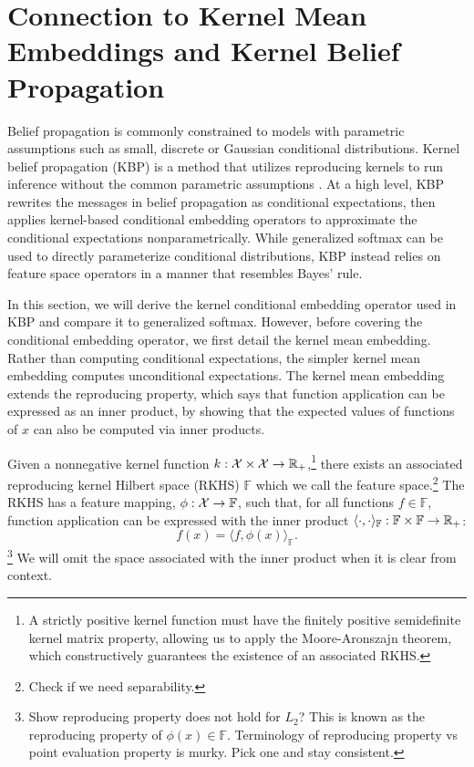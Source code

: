 \documentclass{article}
\begin{document}
\section{Connection to Kernel Mean Embeddings and Kernel Belief Propagation}
Belief propagation is commonly constrained to models with parametric assumptions such as
small, discrete or Gaussian conditional distributions.
Kernel belief propagation (KBP) is a method that utilizes reproducing kernels
to run inference without the common parametric assumptions \citep{song2010tree,song2011kernelbp}.
At a high level, KBP rewrites the messages in belief propagation as conditional
expectations, then applies kernel-based conditional embedding operators
to approximate the conditional expectations nonparametrically.
While generalized softmax can be used to directly parameterize conditional distributions,
KBP instead relies on feature space operators in a manner that resembles Bayes' rule.

In this section, we will derive the kernel conditional embedding operator
used in KBP and compare it to generalized softmax.
However, before covering the conditional embedding operator, we first
detail the kernel mean embedding.
Rather than computing conditional expectations,
the simpler kernel mean embedding computes unconditional expectations.
The kernel mean embedding extends the reproducing property,
which says that function application can be expressed as an inner product,
by showing that the expected values of functions of $x$ can also
be computed via inner products.

Given a nonnegative kernel function $k:\mathcal{X}\times\mathcal{X}\to\mathbb{R}_+$,\footnote{
A strictly positive kernel function must have the finitely positive semidefinite
kernel matrix property, allowing us to apply the Moore-Aronszajn theorem,
which constructively guarantees the existence of an associated RKHS.
}
there exists an associated reproducing kernel Hilbert space (RKHS) $\mathbb{F}$
which we call the feature space.\footnote{
Check if we need separability.
}
The RKHS has a feature mapping, $\phi:\mathcal{X}\to\mathbb{F}$,
such that, for all functions $f\in\mathbb{F}$,
function application can be expressed with the inner product
$\langle\cdot,\cdot\rangle_\mathbb{F}:\mathbb{F}\times\mathbb{F}\to\mathbb{R}_+$:
$$f(x) = \langle f, \phi(x)\rangle_\mathbb{F}.$$
\footnote{
Show reproducing property does not hold for $L_2$?
This is known as the reproducing property of $\phi(x)\in\mathbb{F}$.
Terminology of reproducing property vs point evaluation property is murky.
Pick one and stay consistent.
}
We will omit the space associated with the inner product when it is clear from context.
\end{document}
